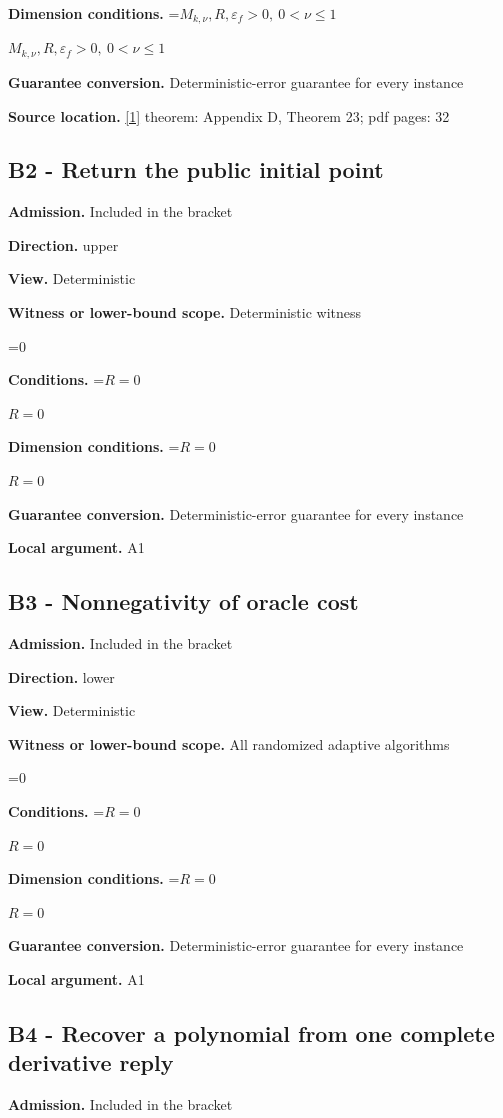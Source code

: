 \documentclass[10pt,a4paper]{article}
\newcommand{\AtlasMath}[1]{\par\begingroup\centering\setbox0=\hbox{$\displaystyle #1$}\ifdim\wd0>1.4\linewidth\typeout{ATLAS WIDE FORMULA: \the\wd0}\fi\ifdim\wd0>\linewidth\resizebox{\linewidth}{!}{\box0}\else\box0\fi\par\endgroup}
\newcommand{\AtlasInlineMath}[1]{\begingroup\setbox0=\hbox{$#1$}\ifdim\wd0>.4\linewidth\endgroup\AtlasMath{#1}\else\endgroup$#1$\fi}
\begin{document}
\textbf{Dimension conditions.} \AtlasInlineMath{M_{k,\nu},R,\varepsilon_f>0,\ 0<\nu\le1}

\textbf{Guarantee conversion.} Deterministic-error guarantee for every instance

\textbf{Source location.} \href{https://arxiv.org/pdf/2411.08987v2}{[1]} theorem: Appendix D, Theorem 23; pdf pages: 32

\subsection{B2 - Return the public initial point}
\textbf{Admission.} Included in the bracket

\textbf{Direction.} upper

\textbf{View.} Deterministic

\textbf{Witness or lower-bound scope.} Deterministic witness

\AtlasMath{0}
\textbf{Conditions.} \AtlasInlineMath{R=0}

\textbf{Dimension conditions.} \AtlasInlineMath{R=0}

\textbf{Guarantee conversion.} Deterministic-error guarantee for every instance

\textbf{Local argument.} A1

\subsection{B3 - Nonnegativity of oracle cost}
\textbf{Admission.} Included in the bracket

\textbf{Direction.} lower

\textbf{View.} Deterministic

\textbf{Witness or lower-bound scope.} All randomized adaptive algorithms

\AtlasMath{0}
\textbf{Conditions.} \AtlasInlineMath{R=0}

\textbf{Dimension conditions.} \AtlasInlineMath{R=0}

\textbf{Guarantee conversion.} Deterministic-error guarantee for every instance

\textbf{Local argument.} A1

\subsection{B4 - Recover a polynomial from one complete derivative reply}
\textbf{Admission.} Included in the bracket
\end{document}
